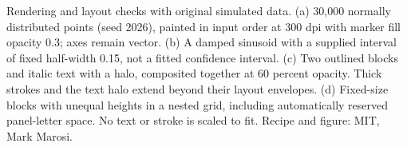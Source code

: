 \caption{Rendering and layout checks with original simulated data. (a) 30,000 normally distributed points (seed 2026), painted in input order at 300 dpi with marker fill opacity 0.3; axes remain vector. (b) A damped sinusoid with a supplied interval of fixed half-width 0.15, not a fitted confidence interval. (c) Two outlined blocks and italic text with a halo, composited together at 60 percent opacity. Thick strokes and the text halo extend beyond their layout envelopes. (d) Fixed-size blocks with unequal heights in a nested grid, including automatically reserved panel-letter space. No text or stroke is scaled to fit. Recipe and figure: MIT, Mark Marosi.}
